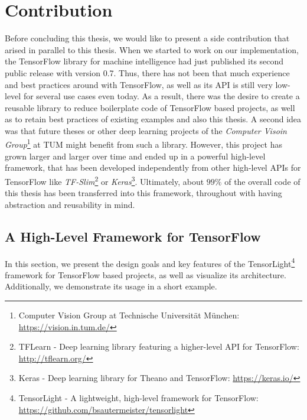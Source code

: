 

\chapter{Contribution} \label{chapter:contribution}

Before concluding this thesis, we would like to present a side contribution that arised in parallel to this thesis. When we started to work on our implementation, the TensorFlow library for machine intelligence had just published its second public release with version \num{0.7}. Thus, there has not been that much experience and best practices around with TensorFlow, as well as its API is still very low-level for several use cases even today. As a result, there was the desire to create a reusable library to reduce boilerplate code of TensorFlow based projects, as well as to retain best practices of existing examples and also this thesis. A second idea was that future theses or other deep learning projects of the \textit{Computer Visoin Group}\footnote{Computer Vision Group at Technische Universität München: \url{https://vision.in.tum.de/}} at TUM might benefit from such a library. However, this project has grown larger and larger over time and ended up in a powerful high-level framework, that has been developed independently from other high-level APIs for TensorFlow like \textit{TF-Slim}\footnote{TFLearn - Deep learning library featuring a higher-level API for TensorFlow: \url{http://tflearn.org/}} or \textit{Keras}\footnote{Keras - Deep learning library for Theano and TensorFlow: \url{https://keras.io/}}. Ultimately, about $ 99\% $ of the overall code of this thesis has been transferred into this framework, throughout with having abstraction and reusability in mind.


\section{A High-Level Framework for TensorFlow}

In this section, we present the design goals and key features of the TensorLight\footnote{TensorLight - A lightweight, high-level framework for TensorFlow:\\ \url{https://github.com/bsautermeister/tensorlight}} framework for TensorFlow based projects, as well as visualize its architecture. Additionally, we demonstrate its usage in a short example. 



